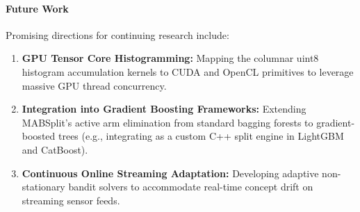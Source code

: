 \documentclass{article}
\begin{document}
	\vspace{0.8cm}
	\paragraph{Future Work}
	Promising directions for continuing research include:
	\begin{enumerate}
		\item \textbf{GPU Tensor Core Histogramming:} Mapping the columnar uint8 histogram accumulation kernels to CUDA and OpenCL primitives to leverage massive GPU thread concurrency.
		\item \textbf{Integration into Gradient Boosting Frameworks:} Extending MABSplit's active arm elimination from standard bagging forests to gradient-boosted trees (e.g., integrating as a custom C++ split engine in LightGBM and CatBoost).
		\item \textbf{Continuous Online Streaming Adaptation:} Developing adaptive non-stationary bandit solvers to accommodate real-time concept drift on streaming sensor feeds.
	\end{enumerate}

	\pagebreak
	
\end{document}
